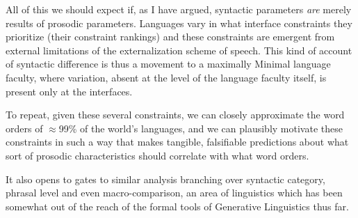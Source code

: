 \documentclass{article}
\begin{document}
All of this we should expect if, as I have argued, syntactic parameters \emph{are} merely results of prosodic parameters.
Languages vary in what interface constraints they prioritize (their constraint rankings) and these constraints are emergent from external limitations of the externalization scheme of speech.
This kind of account of syntactic difference is thus a movement to a maximally Minimal language faculty, where variation, absent at the level of the language faculty itself, is present only at the interfaces.

To repeat, given these several constraints, we can closely approximate the word orders of $\approx$99\% of the world's languages, and we can plausibly motivate these constraints in such a way that makes tangible, falsifiable predictions about what sort of prosodic characteristics should correlate with what word orders.

It also opens to gates to similar analysis branching over syntactic category, phrasal level and even macro-comparison, an area of linguistics which has been somewhat out of the reach of the formal tools of Generative Linguistics thus far.

\printbibliography
\end{document}
